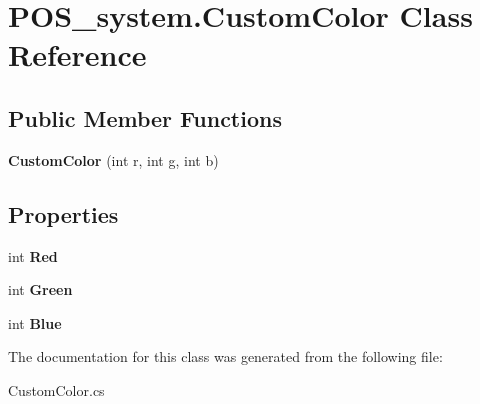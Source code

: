 \hypertarget{class_p_o_s__system_1_1_custom_color}{}\section{P\+O\+S\+\_\+system.\+Custom\+Color Class Reference}
\label{class_p_o_s__system_1_1_custom_color}
\subsection*{Public Member Functions}
\begin{DoxyCompactItemize}
\item 
\mbox{\label{class_p_o_s__system_1_1_custom_color_ae7b595e59b7a18db44d203e8ee897b58}} 
{\bfseries Custom\+Color} (int r, int g, int b)
\end{DoxyCompactItemize}
\subsection*{Properties}
\begin{DoxyCompactItemize}
\item 
\mbox{\label{class_p_o_s__system_1_1_custom_color_a432ec44bd0451d6592eadf6272e816ad}} 
int {\bfseries Red}
\item 
\mbox{\label{class_p_o_s__system_1_1_custom_color_ad1612ec428d812c6697df0cf5098ba7b}} 
int {\bfseries Green}
\item 
\mbox{\label{class_p_o_s__system_1_1_custom_color_abcd0ffd85216ba870e7982be7289f163}} 
int {\bfseries Blue}
\end{DoxyCompactItemize}


The documentation for this class was generated from the following file\+:\begin{DoxyCompactItemize}
\item 
Custom\+Color.\+cs\end{DoxyCompactItemize}
